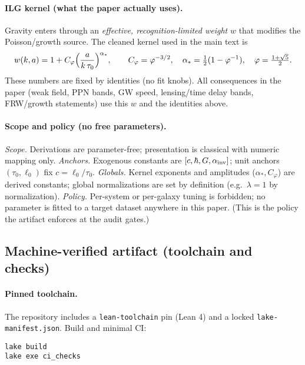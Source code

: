 \documentclass[12pt,a4paper]{article}
\begin{document}
\paragraph{ILG kernel (what the paper actually uses).}
Gravity enters through an \emph{effective, recognition-limited weight} \(w\) that modifies the Poisson/growth source. The cleaned kernel used in the main text is
\[
w(k,a)=1+C_\varphi\Bigl(\frac{a}{k\,\tau_0}\Bigr)^{\alpha_*},
\qquad
C_\varphi=\varphi^{-3/2},\quad \alpha_*=\tfrac12(1-\varphi^{-1}),\quad \varphi=\tfrac{1+\sqrt5}{2}.
\]
These numbers are fixed by identities (no fit knobs). All consequences in the paper (weak field, PPN bands, GW speed, lensing/time delay bands, FRW/growth statements) use this \(w\) and the identities above.

\paragraph{Scope and policy (no free parameters).}
\emph{Scope.} Derivations are parameter-free; presentation is classical with numeric mapping only. \emph{Anchors.} Exogenous constants are \([c,\hbar,G,\alpha_{\rm inv}]\); unit anchors \((\tau_0,\ell_0)\) fix \(c=\ell_0/\tau_0\). \emph{Globals.} Kernel exponents and amplitudes (\(\alpha_*,C_\varphi\)) are derived constants; global normalizations are set by definition (e.g.\ \(\lambda=1\) by normalization). \emph{Policy.} Per-system or per-galaxy tuning is forbidden; no parameter is fitted to a target dataset anywhere in this paper. (This is the policy the artifact enforces at the audit gates.)

\subsection{Machine-verified artifact (toolchain and checks)}
\paragraph{Pinned toolchain.}
The repository includes a \texttt{lean-toolchain} pin (Lean 4) and a locked \texttt{lake-manifest.json}. Build and minimal CI:
\begin{verbatim}
lake build
lake exe ci_checks
\end{verbatim}
\end{document}
